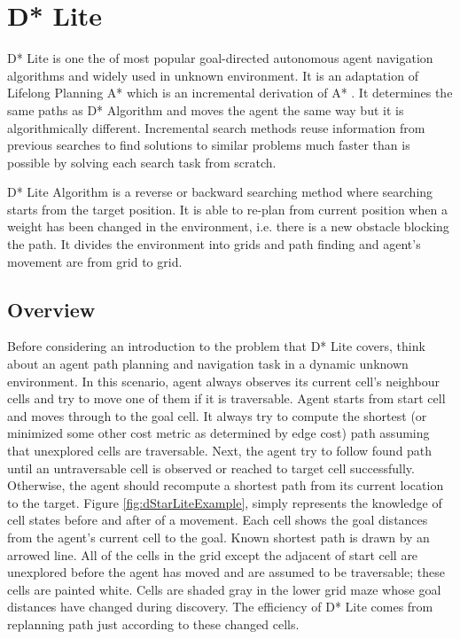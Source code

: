 
\section{D* Lite}

D* Lite \cite{Koenig:2002} is one the of most popular goal-directed autonomous agent navigation algorithms and widely used in unknown environment. It is an adaptation of Lifelong Planning A* \cite{LPAStarKoenig:2004} which is an incremental derivation of A* \cite{AStarHart:1968}. It determines the same paths as D* Algorithm \cite{DStar:1994} and moves the agent the same way but it is algorithmically different. Incremental search methods reuse information from previous searches to find solutions to similar problems much faster than is possible by solving each search task from scratch.

D* Lite Algorithm is a reverse or backward searching method where searching starts from the target position. It is able to re-plan from current position when a weight has been changed in the environment, i.e. there is a new obstacle blocking the path. It divides the environment into grids and path finding and agent's movement are from grid to grid.

\subsection{Overview}

Before considering an introduction to the problem that D* Lite covers, think about an agent path planning and navigation task in a dynamic unknown environment. In this scenario, agent always observes its current cell's neighbour cells and try to move one of them if it is traversable. Agent starts from start cell and moves through to the goal cell. It always try to compute the shortest (or minimized some other cost metric as determined by edge cost) path assuming that unexplored cells are traversable. Next, the agent try to follow found path until an untraversable cell is observed or reached to target cell successfully. Otherwise, the agent should recompute a shortest path from its current location to the target. Figure \ref{fig:dStarLiteExample}, simply represents the knowledge of cell states before and after of a movement. Each cell shows the goal distances from the agent's current cell to the goal. Known shortest path is drawn by an arrowed line. All of the cells in the grid except the adjacent of start cell are unexplored before the agent has moved and are assumed to be traversable; these cells are painted white. Cells are shaded gray in the lower grid maze whose goal distances have changed during discovery. The efficiency of D* Lite comes from replanning path just according to these changed cells.

